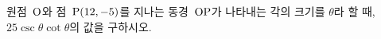 원점~$\mathrm{O}$와 점~$\mathrm{P}(12{,}\mkern3mu\mathopen{}-5)$를 지나는 동경~$\mathrm{OP}$가 나타내는 각의 크기를 $\theta$라 할 때, $25\csc\theta\cot\theta$의 값을 구하시오.
